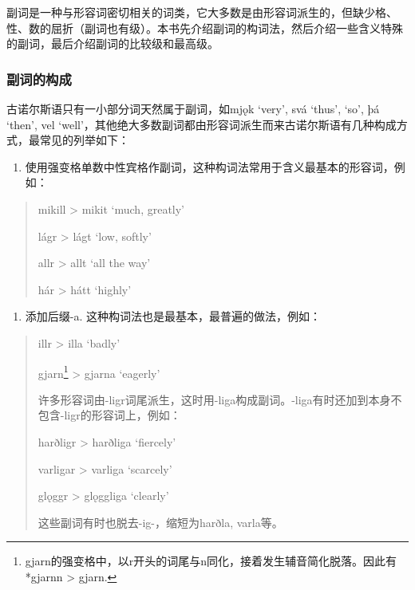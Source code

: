 副词是一种与形容词密切相关的词类，它大多数是由形容词派生的，但缺少格、性、数的屈折（副词也有级）。本书先介绍副词的构词法，然后介绍一些含义特殊的副词，最后介绍副词的比较级和最高级。

\subsubsection{副词的构成}\label{ux526fux8bcdux7684ux6784ux6210}

古诺尔斯语只有一小部分词天然属于副词，如mjǫk `very', svá `thus', `so',
þá `then', vel
`well'，其他绝大多数副词都由形容词派生而来古诺尔斯语有几种构成方式，最常见的列举如下：

\begin{enumerate}
\def\labelenumi{\arabic{enumi})}
\item
  使用强变格单数中性宾格作副词，这种构词法常用于含义最基本的形容词，例如：
\end{enumerate}

\begin{quote}
mikill \textgreater{} mikit `much, greatly‌'

lágr \textgreater{} lágt `low, softly‌'

allr \textgreater{} allt `all the way‌'

hár \textgreater{} hátt `highly‌'
\end{quote}

\begin{enumerate}
\def\labelenumi{\arabic{enumi})}
\setcounter{enumi}{1}
\item
  添加后缀-a. 这种构词法也是最基本，最普遍的做法，例如：
\end{enumerate}

\begin{quote}
illr \textgreater{} illa `badly‌'

gjarn\footnote{gjarn的强变格中，以r开头的词尾与n同化，接着发生辅音简化脱落。因此有*gjarnn
  \textgreater{} gjarn.} \textgreater{} gjarna `eagerly‌'

许多形容词由-ligr词尾派生，这时用-liga构成副词。-liga有时还加到本身不包含-ligr的形容词上，例如：

harðligr \textgreater{} harðliga `fiercely‌'

varligar \textgreater{} varliga `scarcely‌'

glǫggr \textgreater{} glǫggliga `clearly'

这些副词有时也脱去-ig-，缩短为harðla, varla等。
\end{quote}

